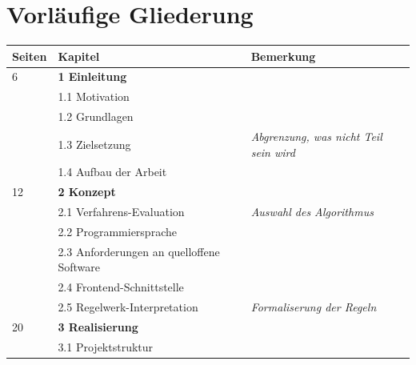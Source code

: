\section{Vorläufige Gliederung}
\label{sec:vorlaufige-gliederung}

{
    \setlength\tabcolsep{1pt} %
    \renewcommand{\arraystretch}{1.3} %
    \begin{tabularx}{\textwidth}{p{}p{}p{}} %
        Seiten & Kapitel                                   & Bemerkung                                     \\
        \midrule
        6      & \textbf{1 Einleitung}                     &                                               \\
        ~      & 1.1 Motivation                            &                                               \\
        ~      & 1.2 Grundlagen                            &                                               \\
        ~      & 1.3 Zielsetzung \dotfill                  & \textit{Abgrenzung, was nicht Teil sein wird} \\
        ~      & 1.4 Aufbau der Arbeit                     &                                               \\
        12     & \textbf{2 Konzept}                        &                                               \\
        ~      & 2.1 Verfahrens-Evaluation \dotfill        & \textit{Auswahl des Algorithmus}              \\
        ~      & 2.2 Programmiersprache                    &                                               \\
        ~      & 2.3 Anforderungen an quelloffene Software &                                               \\
        ~      & 2.4 Frontend-Schnittstelle                &                                               \\
        ~      & 2.5 Regelwerk-Interpretation \dotfill     & \textit{Formaliserung der Regeln}             \\
        20     & \textbf{3 Realisierung}                   &                                               \\
        ~      & 3.1 Projektstruktur                       &                                               \\

\end{tabularx}}

